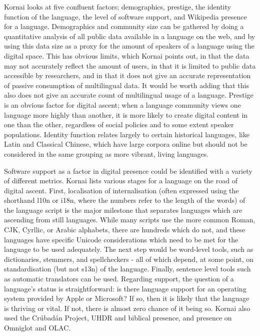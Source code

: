 Kornai looks at five confluent factors; demographics, prestige, the identity function of the language, the level of software support, and Wikipedia presence for a language. Demographics and community size can be gathered by doing a quantitative analysis of all public data available in a language on the web, and by using this data size as a proxy for the amount of speakers of a language using the digital space. This has obvious limits, which Kornai points out, in that the data may not accurately reflect the amount of users, in that it is limited to public data accessible by researchers, and in that it does not give an accurate representation of passive consumption of multilingual data. It would be worth adding that this also does not give an accurate count of multilingual usage of a language. Prestige is an obvious factor for digital ascent; when a language community views one language more highly than another, it is more likely to create digital content in one than the other, regardless of social policies and to some extent speaker populations. Identity function relates largely to certain historical languages, like Latin and Classical Chinese, which have large corpora online but should not be considered in the same grouping as more vibrant, living languages.

Software support as a factor in digital presence could be identified with a variety of different metrics. Kornai lists various stages for a language on the road of digital ascent. First, localisation of internalisation (often expressed using the shorthand l10n or i18n, where the numbers refer to the length of the words) of the language script is the major milestone that separates languages which are ascending from still languages. While many scripts use the more common Roman, CJK, Cyrllic, or Arabic alphabets, there are hundreds which do not, and these languages have specific Unicode considerations which need to be met for the language to be used adequately. The next step would be word-level tools, such as dictionaries, stemmers, and spellcheckers - all of which depend, at some point, on standardisation (but not s13n) of the language. Finally, sentence level tools such as automatic translators can be used. Regarding support, the question of a language's status is straightforward: is there language support for an operating system provided by Apple or Microsoft? If so, then it is likely that the language is thriving or vital. If not, there is almost zero chance of it being so. Kornai also used the Cr\'ubad\'an Project, UHDR and biblical presence, and presence on Omniglot and OLAC.


